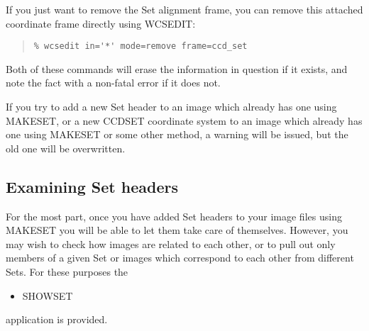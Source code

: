 \documentclass[twoside,11pt]{article}
\newcommand{\htmlref}[2]{#1}
\renewcommand{\_}{\texttt{\symbol{95}}}
\newenvironment{myquote}{\begin{quote}\begin{small}}{\end{small}\end{quote}}
\newcommand{\routine}[1]{{\sc #1}}
\newcommand{\xroutine}[1]{\htmlref{{\sc #1}}{#1}}
\begin{document}
If you just want to remove the Set alignment frame, you can 
remove this attached coordinate frame directly using \xroutine{WCSEDIT}:
\begin{myquote}
\begin{verbatim}
% wcsedit in='*' mode=remove frame=ccd_set
\end{verbatim}
\end{myquote}

Both of these commands will erase the information in question if
it exists, and note the fact with a non-fatal error if it does not.

If you try to add a new Set header to
an image which already has one using \routine{MAKESET}, 
or a new CCD\_SET coordinate system to an image which already has one
using \routine{MAKESET} or some other method,
a warning will be issued, but
the old one will be overwritten.

\subsection{Examining Set headers}

For the most part, once you have added Set headers to your image
files using \routine{MAKESET} you will be able to let them 
take care of themselves.
However, you may wish to check how images are related to each other,
or to pull out only members of a given Set or images which correspond
to each other from different Sets.
For these purposes the
\begin{itemize}
\item \xroutine{SHOWSET}
\end{itemize}
application is provided.
\end{document}
